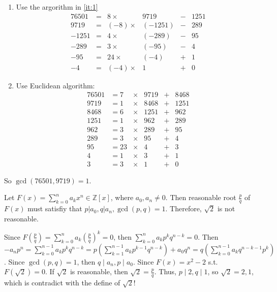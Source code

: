 \documentclass{ctexart}
\begin{document}
\begin{solution}
\begin{enumerate}
\begin{enumerate}
			      \item Use the argorithm in \ref{it:1}
			            \[
				            \begin{aligned}
					            76501 & = & 8   \times   & 9719    & - & 1251 \\
					            9719  & = & (-8)  \times & (-1251) & - & 289  \\
					            -1251 & = & 4   \times   & (-289)  & - & 95   \\
					            -289  & = & 3   \times   & (-95)   & - & 4    \\
					            -95   & = & 24  \times   & (-4)    & + & 1    \\
					            -4    & = & (-4)  \times & 1       & + & 0
				            \end{aligned}
			            \]
			      \item Use Euclidean algorithm:\\
			            \[
				            \begin{aligned}
					            76501 & = 7  & \times & 9719 & + & 8468 \\
					            9719  & = 1  & \times & 8468 & + & 1251 \\
					            8468  & = 6  & \times & 1251 & + & 962  \\
					            1251  & = 1  & \times & 962  & + & 289  \\
					            962   & = 3  & \times & 289  & + & 95   \\
					            289   & =3   & \times & 95   & + & 4    \\
					            95    & = 23 & \times & 4    & + & 3    \\
					            4     & = 1  & \times & 3    & + & 1    \\
					            3     & = 3  & \times & 1    & + & 0
				            \end{aligned}
			            \]
		      \end{enumerate}
		      So \(\gcd(76501,9719)=1\).
	\end{enumerate}

\end{solution}
\begin{problem}
Let \(F(x)=\sum_{k=0}^na_kx^{n} \in \mathbb{Z}[x]\), where \(a_0,a_n \neq 0\). Then reasonable root \(\frac{p}{q}\) of \(F(x)\)
must satisfiy that \(p | a_0, q | a_n, \gcd(p,q)=1\). Therefore, \(\sqrt{2}\) is not reasonable.

\end{problem}
\begin{solution}
	Since \(F(\frac{p}{q}) = \sum_{k=0}^na_k (\frac{p}{q})^{k}=0\), then \(\sum_{k=0}^na_kp^{k}q^{n-k}=0\).
	Then \(-a_np^n=\sum_{k=0}^{n-1}a_kp^{k}q^{n-k}=p(\sum_{k=1}^{n-1}a_kp^{k-1}q^{n-k})+a_0q^n=q(\sum_{k=0}^{n-1}a_kq^{n-k-1}p^{k})\).
	Since \(\gcd(p,q) = 1\), then \(q \mid a_n, p \mid a_0\).
	Since \(F(x)=x^2-2\) s.t. \(F(\sqrt{2}) = 0\). If \(\sqrt{2}\) is reasonable, then \(\sqrt{2} =\frac{p}{q}\).
	Thus, \(p \mid 2, q \mid 1\), so \(\sqrt{2}=2,1\), which is contradict with the define of \(\sqrt{2}\)!
\end{solution}
\end{document}
